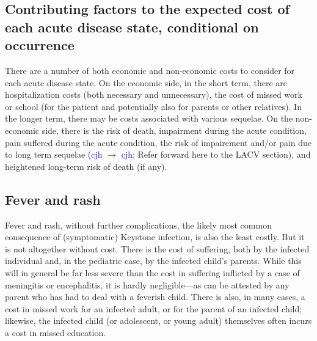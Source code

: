 \documentclass[12pt]{article}
\newcommand{\cjh}{\textcolor{blue}{cjh}}
\newcommand{\msg}[3]{(#1 $\rightarrow$ #2: #3)}
\newcommand{\mcc}[1]{\msg\cjh\cjh{#1}}
\begin{document}


        \subsection{Contributing factors to the expected cost of each acute disease state, conditional on occurrence}
            \label{cost-factors}
            There are a number of both economic and non-economic costs to consider for each acute disease state. On the economic side, in the short term, there are hospitalization costs (both necessary and unnecessary), the cost of missed work or school (for the patient and potentially also for parents or other relatives). In the longer term, there may be costs associated with various sequelae. On the non-economic side, there is the risk of death, impairment during the acute condition, pain suffered during the acute condition, the risk of impairement and/or pain due to long term sequelae \mcc{Refer forward here to the LACV section}, and heightened long-term risk of death (if any).

        \subsection{Fever and rash}
            \label{cost-fever}
            Fever and rash, without further complications, the likely most common consequence of (symptomatic) Keystone infection, is also the least costly. But it is not altogether without cost. There is the cost of suffering, both by the infected individual and, in the pediatric case, by the infected child's parents. While this will in general be far less severe than the cost in suffering inflicted by a case of meningitis or encephalitis, it is hardly negligible---as can be attested by any parent who has had to deal with a feverish child. There is also, in many cases, a cost in missed work for an infected adult, or for the parent of an infected child; likewise, the infected child (or adolescent, or young adult) themselves often incurs a cost in missed education.
\end{document}
